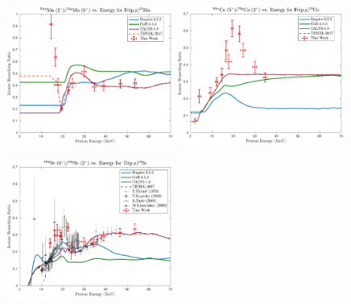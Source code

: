 \begin{figure}
 \centering
 \includegraphics[width=0.49\textwidth]{./figures/52Mn_IBR.pdf}
 \includegraphics[width=0.49\textwidth]{./figures/58Co_IBR.pdf}
 
%  
 \includegraphics[width=0.49\textwidth]{./figures/44Sc_IBR.pdf}
%  
%  
% 
\end{figure}

     

